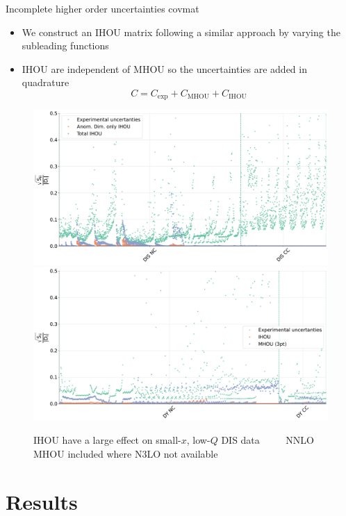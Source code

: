 \documentclass[aspectratio=169, 9pt,t]{beamer}
\begin{document}
\begin{frame}{Incomplete higher order uncertainties covmat}
  \begin{itemize}
    \item We construct an IHOU matrix following a similar approach by varying the subleading functions
    \item IHOU are independent of MHOU so the uncertainties are added in quadrature
    $$C = C_\mathrm{exp}+C_\mathrm{MHOU}+C_\mathrm{IHOU}$$
  \end{itemize}
  \begin{figure}[!t]
    \centering
    \includegraphics[width=.48\textwidth]{figures/diag_cov_dis_ihou.pdf}
    \includegraphics[width=.48\textwidth]{figures/diag_cov_dy_ihou_3pt_mhou.pdf}
    \caption*{IHOU have a large effect on small-$x$, low-$Q$ DIS data $\qquad$ NNLO MHOU included where N3LO not available
    }
  \end{figure}
\end{frame}


\section{Results}
\end{document}
